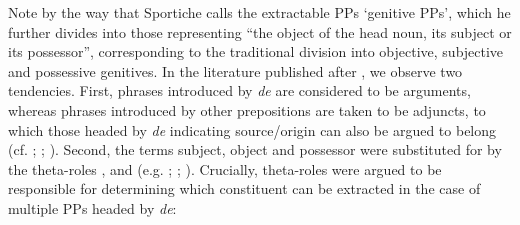 \documentclass[output=paper]{langsci/langscibook}
\begin{document}
Note by the way that Sportiche calls the extractable PPs ‘genitive PPs’, which he further divides into those representing “the object of the head noun, its subject or its possessor”, corresponding to the traditional division into objective, subjective and possessive genitives. In the literature published after \citet{Sportiche1981}, we observe two tendencies. First, phrases introduced by \textit{de} are considered to be arguments, whereas phrases introduced by other prepositions are taken to be adjuncts, to which those headed by \textit{de} indicating source/origin can also be argued to belong (cf. \citealt{Cinque1990}; \citealt{Moritz1994}; \citealt[586]{Alexiadou2007Noun}). Second, the terms subject, object and possessor were substituted for by the theta-roles \AGENT, \THEME and \POSSESSOR (e.g. \citealt{Pollock1989}; \citealt{Valois1991}; \citealt{Godard1992}). Crucially, theta-roles were argued to be responsible for determining which constituent can be extracted in the case of multiple PPs headed by \textit{de}:

\ea%
    \label{ex:mensch:9}
    \z
\z    
\end{document}
